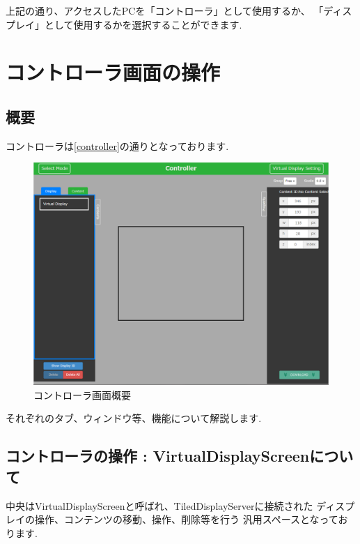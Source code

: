 \documentclass[a4paper,10pt,oneside]{jsbook}
\begin{document}
上記の通り、アクセスしたPCを「コントローラ」として使用するか、
「ディスプレイ」として使用するかを選択することができます.\\

\newpage


\chapter{コントローラ画面の操作}
\section{概要}
コントローラは\ref{controller}の通りとなっております.\\
\begin{figure}[htbp]
	\begin{center}
		\includegraphics[width=15.5cm]{image/cont_1.PNG}
	\end{center}
	\caption{コントローラ画面概要}
	\label{fig:controller}
\end{figure}

それぞれのタブ、ウィンドウ等、機能について解説します.\\

\newpage


\section{コントローラの操作 : VirtualDisplayScreenについて}
中央はVirtualDisplayScreenと呼ばれ、TiledDisplayServerに接続された
ディスプレイの操作、コンテンツの移動、操作、削除等を行う
汎用スペースとなっております.\\
\end{document}
